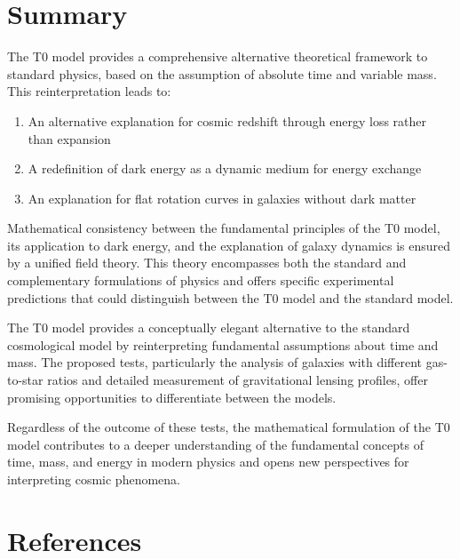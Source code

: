 \documentclass[a4paper,12pt]{article}
\theoremstyle{definition}
\theoremstyle{remark}
\begin{document}
	\section{Summary}
	
	The T0 model provides a comprehensive alternative theoretical framework to standard physics, based on the assumption of absolute time and variable mass. This reinterpretation leads to:
	
	\begin{enumerate}
		\item An alternative explanation for cosmic redshift through energy loss rather than expansion
		\item A redefinition of dark energy as a dynamic medium for energy exchange
		\item An explanation for flat rotation curves in galaxies without dark matter
	\end{enumerate}
	
	Mathematical consistency between the fundamental principles of the T0 model, its application to dark energy, and the explanation of galaxy dynamics is ensured by a unified field theory. This theory encompasses both the standard and complementary formulations of physics and offers specific experimental predictions that could distinguish between the T0 model and the standard model.
	
	The T0 model provides a conceptually elegant alternative to the standard cosmological model by reinterpreting fundamental assumptions about time and mass. The proposed tests, particularly the analysis of galaxies with different gas-to-star ratios and detailed measurement of gravitational lensing profiles, offer promising opportunities to differentiate between the models.
	
	Regardless of the outcome of these tests, the mathematical formulation of the T0 model contributes to a deeper understanding of the fundamental concepts of time, mass, and energy in modern physics and opens new perspectives for interpreting cosmic phenomena.
	
	\section{References}
	
\end{document}
